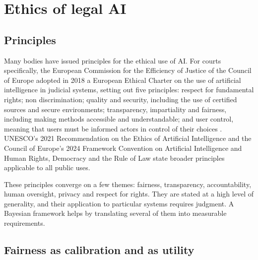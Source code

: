 \section{Ethics of legal AI}

\subsection{Principles}

Many bodies have issued principles for the ethical use of AI. For courts specifically, the European Commission for the Efficiency of Justice of the Council of Europe adopted in 2018 a European Ethical Charter on the use of artificial intelligence in judicial systems, setting out five principles: respect for fundamental rights; non discrimination; quality and security, including the use of certified sources and secure environments; transparency, impartiality and fairness, including making methods accessible and understandable; and user control, meaning that users must be informed actors in control of their choices \citep{cepej2018}. UNESCO's 2021 Recommendation on the Ethics of Artificial Intelligence and the Council of Europe's 2024 Framework Convention on Artificial Intelligence and Human Rights, Democracy and the Rule of Law state broader principles applicable to all public uses.

These principles converge on a few themes: fairness, transparency, accountability, human oversight, privacy and respect for rights. They are stated at a high level of generality, and their application to particular systems requires judgment. A Bayesian framework helps by translating several of them into measurable requirements.

\subsection{Fairness as calibration and as utility}


